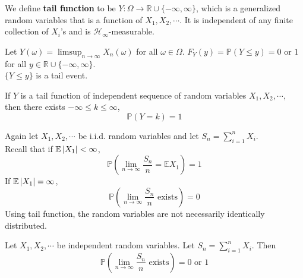 \documentclass{huhtakm-template-book}
\newcommand{\prob}{\mathbb{P}}
\newcommand{\expect}{\mathbb{E}}
\begin{document}
    \begin{defn}
        We define \textbf{tail function} to be $Y:\Omega\to\mathbb{R}\cup\{-\infty,\infty\}$, which is a generalized random variables that is a function of $X_{1},X_{2},\cdots$. It is independent of any finite collection of $X_{i}$'s and is $\mathcal{H}_{\infty}$-measurable.
    \end{defn}
    \begin{eg}
        Let $Y(\omega)=\limsup_{n\to\infty}X_{n}(\omega)$ for all $\omega\in\Omega$. $F_{Y}(y)=\prob(Y\leq y)=0$ or $1$ for all $y\in\mathbb{R}\cup\{-\infty,\infty\}$.\\
        $\{Y\leq y\}$ is a tail event.
    \end{eg}
    \begin{thm}
        If $Y$ is a tail function of independent sequence of random variables $X_{1},X_{2},\cdots$, then there exists $-\infty\leq k\leq\infty$,
        \begin{equation*}
            \prob(Y=k)=1
        \end{equation*}
    \end{thm}
    Again let $X_{1},X_{2},\cdots$ be i.i.d. random variables and let $S_{n}=\sum_{i=1}^{n}X_{i}$.\\
    Recall that if $\expect\abs{X_{1}}<\infty$,
    \begin{equation*}
        \prob\left(\lim_{n\to\infty}\frac{S_{n}}{n}=\expect X_{1}\right)=1
    \end{equation*}
    If $\expect\abs{X_{1}}=\infty$,
    \begin{equation*}
        \prob\left(\lim_{n\to\infty}\frac{S_{n}}{n}\text{ exists}\right)=0
    \end{equation*}
    Using tail function, the random variables are not necessarily identically distributed.
    \begin{thm}
        Let $X_{1},X_{2},\cdots$ be independent random variables. Let $S_{n}=\sum_{i=1}^{n}X_{i}$. Then
        \begin{equation*}
            \prob\left(\lim_{n\to\infty}\frac{S_{n}}{n}\text{ exists}\right)=0\text{ or }1
        \end{equation*}
    \end{thm}
\end{document}
